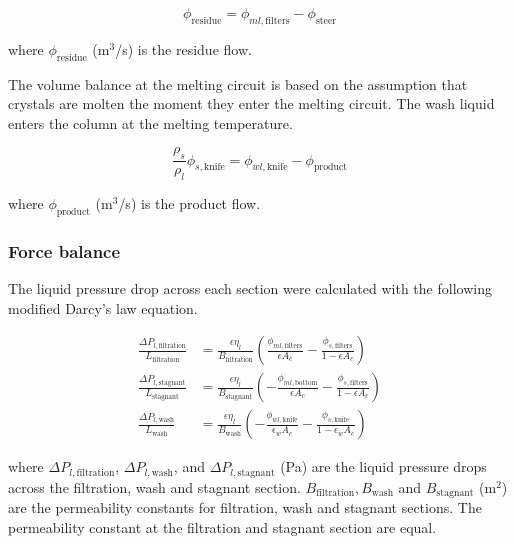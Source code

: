 \begin{equation}
\phi_{\mathrm{residue}}= \phi_{ml,\mathrm{filters}} - \phi_{\mathrm{steer}}
\end{equation}

\noindent where $\phi_{\mathrm{residue}}$ (m$^3$/s) is the residue flow. 

The volume balance at the melting circuit is based on the assumption that crystals are molten the moment they enter the melting circuit. The wash liquid enters the column at the melting temperature.

\begin{equation}
\frac{\rho_s}{\rho_l}\phi_{s,\mathrm{knife}}= \phi_{wl,\mathrm{knife}} - \phi_{\mathrm{product}}
\end{equation}

\noindent where $\phi_{\mathrm{product}}$ (m$^3$/s) is the product flow.


\subsubsection{Force balance}
The liquid pressure drop across each section were calculated with the following modified Darcy's law equation. 

\begin{align}
    \frac{\Delta P_{l,\mathrm{filtration}}}{L_{\mathrm{filtration}}} &= \frac{\epsilon \eta_{l}}{B_{\mathrm{filtration}}}\left(\frac{\phi_{ml,\mathrm{filters}}}{\epsilon A_c} - \frac{\phi_{s,\mathrm{filters}}}{1-\epsilon A_c}\right) \\
    \frac{\Delta P_{l,\mathrm{stagnant}}}{L_{\mathrm{stagnant}}} &= \frac{\epsilon \eta_{l}}{B_{\mathrm{stagnant}}}\left(-\frac{\phi_{ml,\mathrm{bottom}}}{\epsilon A_c} - \frac{\phi_{s,\mathrm{filters}}}{1-\epsilon A_c}\right) \\
    \frac{\Delta P_{l,\mathrm{wash}}}{L_{\mathrm{wash}}} &= \frac{\epsilon \eta_{l}}{B_{\mathrm{wash}}}\left(-\frac{\phi_{wl,\mathrm{knife}}}{\epsilon_w A_c} - \frac{\phi_{s,\mathrm{knife}}}{1-\epsilon_w A_c}\right)
\end{align}

\noindent where $\Delta P_{l,\mathrm{filtration}}$, $\Delta P_{l,\mathrm{wash}}$, and $\Delta P_{l,\mathrm{stagnant}}$ (Pa) are the liquid pressure drops across the filtration, wash and stagnant section. $B_{\mathrm{filtration}},B_{\mathrm{wash}}$ and $B_{\mathrm{stagnant}}$ (m$^2$) are the permeability constants for filtration, wash and stagnant sections. The permeability constant at the filtration and stagnant section are equal. 

